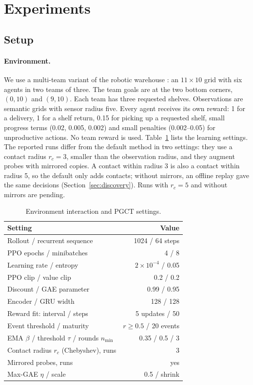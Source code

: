 \documentclass{article}
\begin{document}
\section{Experiments}
\subsection{Setup}\label{sec:setup}
\paragraph{Environment.} We use a multi-team variant of the robotic warehouse \cite{benchmark}: an $11\times10$ grid with six agents in two teams of three. The team goals are at the two bottom corners, $(0,10)$ and $(9,10)$. Each team has three requested shelves. Observations are semantic grids with sensor radius five. Every agent receives its own reward: 1 for a delivery, 1 for a shelf return, 0.15 for picking up a requested shelf, small progress terms (0.02, 0.005, 0.002) and small penalties (0.002--0.05) for unproductive actions. No team reward is used. Table~\ref{tab:settings} lists the learning settings. The reported runs differ from the default method in two settings: they use a contact radius $r_c=3$, smaller than the observation radius, and they augment probes with mirrored copies. A contact within radius 3 is also a contact within radius 5, so the default only adds contacts; without mirrors, an offline replay gave the same decisions (Section~\ref{sec:discovery}). Runs with $r_c=5$ and without mirrors are pending.

\begin{table}[t]\centering\small
\begin{tabular}{lr}\toprule
Setting & Value\\\midrule
Rollout / recurrent sequence & 1024 / 64 steps\\
PPO epochs / minibatches & 4 / 8\\
Learning rate / entropy & $2\times10^{-4}$ / 0.05\\
PPO clip / value clip & 0.2 / 0.2\\
Discount / GAE parameter & 0.99 / 0.95\\
Encoder / GRU width & 128 / 128\\
Reward fit: interval / steps & 5 updates / 50\\
Event threshold / maturity & $r\ge0.5$ / 20 events\\
EMA $\beta$ / threshold $\tau$ / rounds $n_{\min}$ & 0.35 / 0.5 / 3\\
Contact radius $r_c$ (Chebyshev), runs & 3\\
Mirrored probes, runs & yes\\
Max-GAE $\eta$ / scale & 0.5 / shrink\\\bottomrule
\end{tabular}
\caption{Environment interaction and PGCT settings.}\label{tab:settings}
\end{table}
\end{document}
